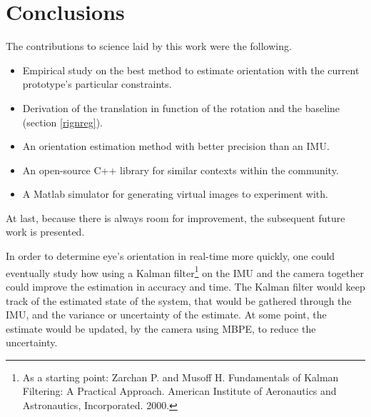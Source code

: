 
\section{Conclusions}
\label{sec:conclusions}

The contributions to science laid by this work were the following.

\begin{itemize}
\item Empirical study on the best method to estimate orientation with the current prototype's particular constraints.

\item Derivation of the translation in function of the rotation and the baseline (section \ref{rignreg}).

\item An orientation estimation method with better precision than an IMU.

\item An open-source C++ library for similar contexts within the community.

\item A Matlab simulator for generating virtual images to experiment with.

\end{itemize}

At last, because there is always room for improvement, the subsequent future work is presented.

In order to determine eye's orientation in real-time more quickly, one could eventually study how using a Kalman filter\footnote{As a starting point: Zarchan P. and Musoff H. Fundamentals of Kalman Filtering: A Practical Approach. American Institute of Aeronautics and Astronautics, Incorporated. 2000. } on the IMU and the camera together could improve the estimation in accuracy and time. The Kalman filter would keep track of the estimated state of the system, that would be gathered through the IMU, and the variance or uncertainty of the estimate. At some point, the estimate would be updated, by the camera using MBPE, to reduce the uncertainty.